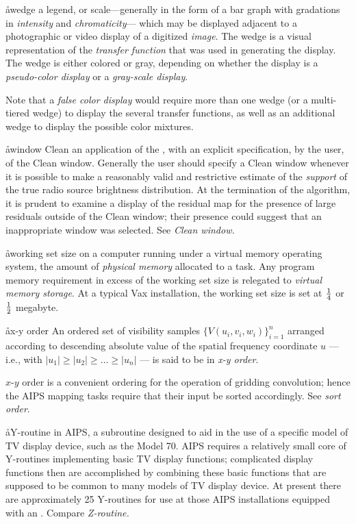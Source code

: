 \aa{wedge}
a legend, or scale---generally in the form of a bar graph
with gradations in {\it intensity} and {\it chromaticity}\/---%
which may be displayed adjacent to a photographic or video
display of a digitized {\it image}.
The wedge is a visual representation
of the {\it transfer function} that was used in generating the display.
The wedge is either colored or gray, depending on whether the
display is a {\it pseudo-color display} or a {\it gray-scale display}.
\par
Note that a {\it false color display} would require more than one
wedge (or a multi-tiered wedge) to display the several transfer functions,
as well as an additional wedge to display the possible color mixtures.

\aa{window Clean}
an application of the \hca\/, with an
explicit specification, by the user, of the Clean window.
Generally the user should specify a Clean window
whenever it is possible to make a reasonably valid and restrictive
estimate of the {\it support}
of the true radio source brightness distribution.
At the termination of the algorithm,
it is prudent to examine a display of the residual map
for the presence of large residuals outside of the Clean window;
their presence could suggest that an inappropriate window was selected.
See {\it Clean window.}

\aa{working set size}
on a computer running under a virtual memory operating system,
the amount of {\it physical memory} allocated to a task.
Any program memory requirement in excess of the working set size
is relegated to {\it virtual memory storage}.
At a typical Vax installation, the working set size
is set at ${1\over4}$ or $1\over2$ megabyte.

\aa{x-y order}
An ordered set of visibility samples $\{V(u_i,v_i,w_i)\}_{i=1}^n$
arranged according to descending absolute value of the spatial
frequency coordinate $u$ ---
i.e., with $|u_1|\ge|u_2|\ge\dots\ge|u_n|$ ---
is said to be in {\it x-y order}.
\par
$x$-$y$ order is a convenient ordering for the operation of gridding
convolution; hence the AIPS mapping tasks require that their
input  be sorted accordingly.
See {\it sort order}.

\aa{Y-routine}
in AIPS, a subroutine designed to aid in the use of a specific
model of TV display device, such as the {\it\iis} Model 70.
AIPS requires a relatively small core of Y-routines
implementing basic TV display functions;
complicated display functions then are accomplished
by combining these basic functions that are supposed to be
common to many models of TV display device.
At present there are approximately 25
Y-routines for use at those AIPS installations equipped with an \iis.
Compare {\it Z-routine.}

